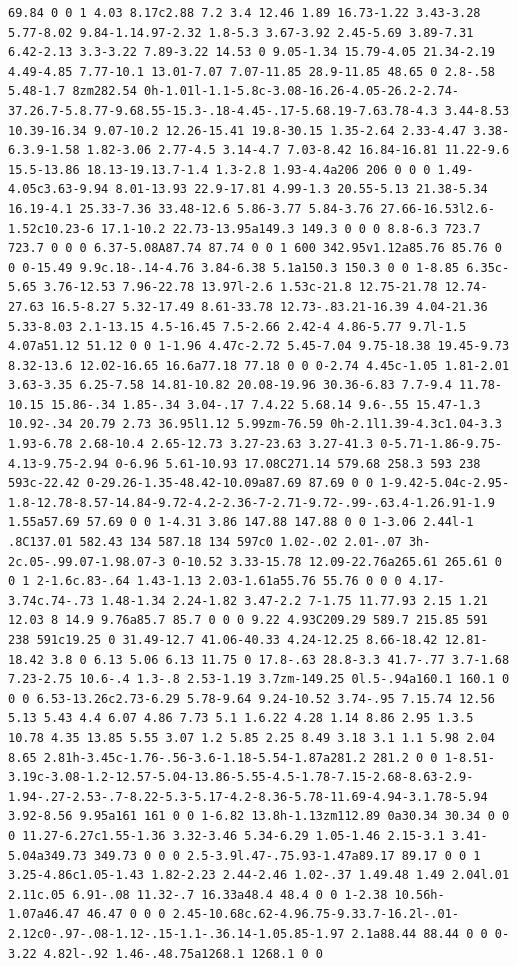 \documentclass[11pt]{article}
\begin{document}
\begin{enumerate}
\begin{verbatim}
69.84 0 0 1 4.03 8.17c2.88 7.2 3.4 12.46 1.89 16.73-1.22 3.43-3.28 5.77-8.02 9.84-1.14.97-2.32 1.8-5.3 3.67-3.92 2.45-5.69 3.89-7.31 6.42-2.13 3.3-3.22 7.89-3.22 14.53 0 9.05-1.34 15.79-4.05 21.34-2.19 4.49-4.85 7.77-10.1 13.01-7.07 7.07-11.85 28.9-11.85 48.65 0 2.8-.58 5.48-1.7 8zm282.54 0h-1.01l-1.1-5.8c-3.08-16.26-4.05-26.2-2.74-37.26.7-5.8.77-9.68.55-15.3-.18-4.45-.17-5.68.19-7.63.78-4.3 3.44-8.53 10.39-16.34 9.07-10.2 12.26-15.41 19.8-30.15 1.35-2.64 2.33-4.47 3.38-6.3.9-1.58 1.82-3.06 2.77-4.5 3.14-4.7 7.03-8.42 16.84-16.81 11.22-9.6 15.5-13.86 18.13-19.13.7-1.4 1.3-2.8 1.93-4.4a206 206 0 0 0 1.49-4.05c3.63-9.94 8.01-13.93 22.9-17.81 4.99-1.3 20.55-5.13 21.38-5.34 16.19-4.1 25.33-7.36 33.48-12.6 5.86-3.77 5.84-3.76 27.66-16.53l2.6-1.52c10.23-6 17.1-10.2 22.73-13.95a149.3 149.3 0 0 0 8.8-6.3 723.7 723.7 0 0 0 6.37-5.08A87.74 87.74 0 0 1 600 342.95v1.12a85.76 85.76 0 0 0-15.49 9.9c.18-.14-4.76 3.84-6.38 5.1a150.3 150.3 0 0 1-8.85 6.35c-5.65 3.76-12.53 7.96-22.78 13.97l-2.6 1.53c-21.8 12.75-21.78 12.74-27.63 16.5-8.27 5.32-17.49 8.61-33.78 12.73-.83.21-16.39 4.04-21.36 5.33-8.03 2.1-13.15 4.5-16.45 7.5-2.66 2.42-4 4.86-5.77 9.7l-1.5 4.07a51.12 51.12 0 0 1-1.96 4.47c-2.72 5.45-7.04 9.75-18.38 19.45-9.73 8.32-13.6 12.02-16.65 16.6a77.18 77.18 0 0 0-2.74 4.45c-1.05 1.81-2.01 3.63-3.35 6.25-7.58 14.81-10.82 20.08-19.96 30.36-6.83 7.7-9.4 11.78-10.15 15.86-.34 1.85-.34 3.04-.17 7.4.22 5.68.14 9.6-.55 15.47-1.3 10.92-.34 20.79 2.73 36.95l1.12 5.99zm-76.59 0h-2.1l1.39-4.3c1.04-3.3 1.93-6.78 2.68-10.4 2.65-12.73 3.27-23.63 3.27-41.3 0-5.71-1.86-9.75-4.13-9.75-2.94 0-6.96 5.61-10.93 17.08C271.14 579.68 258.3 593 238 593c-22.42 0-29.26-1.35-48.42-10.09a87.69 87.69 0 0 1-9.42-5.04c-2.95-1.8-12.78-8.57-14.84-9.72-4.2-2.36-7-2.71-9.72-.99-.63.4-1.26.91-1.9 1.55a57.69 57.69 0 0 1-4.31 3.86 147.88 147.88 0 0 1-3.06 2.44l-1 .8C137.01 582.43 134 587.18 134 597c0 1.02-.02 2.01-.07 3h-2c.05-.99.07-1.98.07-3 0-10.52 3.33-15.78 12.09-22.76a265.61 265.61 0 0 1 2-1.6c.83-.64 1.43-1.13 2.03-1.61a55.76 55.76 0 0 0 4.17-3.74c.74-.73 1.48-1.34 2.24-1.82 3.47-2.2 7-1.75 11.77.93 2.15 1.21 12.03 8 14.9 9.76a85.7 85.7 0 0 0 9.22 4.93C209.29 589.7 215.85 591 238 591c19.25 0 31.49-12.7 41.06-40.33 4.24-12.25 8.66-18.42 12.81-18.42 3.8 0 6.13 5.06 6.13 11.75 0 17.8-.63 28.8-3.3 41.7-.77 3.7-1.68 7.23-2.75 10.6-.4 1.3-.8 2.53-1.19 3.7zm-149.25 0l.5-.94a160.1 160.1 0 0 0 6.53-13.26c2.73-6.29 5.78-9.64 9.24-10.52 3.74-.95 7.15.74 12.56 5.13 5.43 4.4 6.07 4.86 7.73 5.1 1.6.22 4.28 1.14 8.86 2.95 1.3.5 10.78 4.35 13.85 5.55 3.07 1.2 5.85 2.25 8.49 3.18 3.1 1.1 5.98 2.04 8.65 2.81h-3.45c-1.76-.56-3.6-1.18-5.54-1.87a281.2 281.2 0 0 1-8.51-3.19c-3.08-1.2-12.57-5.04-13.86-5.55-4.5-1.78-7.15-2.68-8.63-2.9-1.94-.27-2.53-.7-8.22-5.3-5.17-4.2-8.36-5.78-11.69-4.94-3.1.78-5.94 3.92-8.56 9.95a161 161 0 0 1-6.82 13.8h-1.13zm112.89 0a30.34 30.34 0 0 0 11.27-6.27c1.55-1.36 3.32-3.46 5.34-6.29 1.05-1.46 2.15-3.1 3.41-5.04a349.73 349.73 0 0 0 2.5-3.9l.47-.75.93-1.47a89.17 89.17 0 0 1 3.25-4.86c1.05-1.43 1.82-2.23 2.44-2.46 1.02-.37 1.49.48 1.49 2.04l.01 2.11c.05 6.91-.08 11.32-.7 16.33a48.4 48.4 0 0 1-2.38 10.56h-1.07a46.47 46.47 0 0 0 2.45-10.68c.62-4.96.75-9.33.7-16.2l-.01-2.12c0-.97-.08-1.12-.15-1.1-.36.14-1.05.85-1.97 2.1a88.44 88.44 0 0 0-3.22 4.82l-.92 1.46-.48.75a1268.1 1268.1 0 0 
\end{verbatim}
\end{enumerate}
\end{document}
